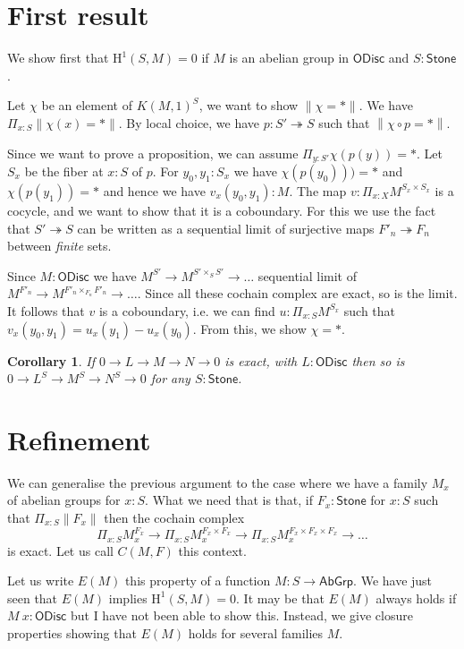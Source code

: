 \documentclass[10pt,a4paper]{article}
\newtheorem{corollary}{Corollary}[section]
\newcommand\HH{\mathrm{H}}
\newcommand{\ODisc}{\mathsf{ODisc}}
\newcommand{\Stone}{\mathsf{Stone}}
\newcommand{\Ab}{\mathsf{AbGrp}}
\newcommand{\ras}{\twoheadrightarrow}
\newcommand\norm[1]{\left\lVert #1 \right\rVert}
\begin{document}
\section{First result}

We show first that $\HH^1(S,M) = 0$ if $M$ is an abelian group in $\ODisc$ and $S:\Stone$.

Let $\chi$ be an element of $K(M,1)^S$, we want to show $\norm{\chi = *}$. We have $\Pi_{x:S}\norm{\chi(x) = *}$.
By local choice, we have $p:S'\ras S$ such that $\norm{\chi\circ p = *}$.

Since we want to prove a proposition, we can assume $\Pi_{y:S'}\chi(p(y)) = *$.
Let $S_x$ be the fiber at $x:S$ of $p$. For $y_0,y_1:S_x$ we have $\chi(p(y_0))) = *$ and $\chi(p(y_1)) = *$
and hence we have $v_x(y_0,y_1):M$. The map $v:\Pi_{x:X}M^{S_x\times S_x}$ is a cocycle, and we want to show
that it is a coboundary. For this we use the fact that $S'\ras S$ can be written as a sequential
limit of surjective maps $F'_n\ras F_n$ between {\em finite} sets.

 Since $M:\ODisc$ we have $M^{S'}\rightarrow M^{S'\times_S S'}\rightarrow\dots$ sequential limit of
 $M^{F'_n}\rightarrow M^{F'_n\times_{F_n} F'_n}\rightarrow\dots$. Since all these cochain complex are exact, so is
 the limit. It follows that $v$ is a coboundary, i.e. we can find $u:\Pi_{x:S}M^{S_x}$ such that
 $v_x(y_0,y_1) = u_x(y_1)-u_x(y_0)$.
 From this, we show $\chi = *$.

 \begin{corollary}\label{Stone1}
   If $0\rightarrow L\rightarrow M\rightarrow N\rightarrow 0$ is exact, with $L:\ODisc$ then
   so is $0\rightarrow L^S\rightarrow M^S\rightarrow N^S\rightarrow 0$ for any $S:\Stone$.
 \end{corollary}
 


\section{Refinement}

We can generalise the previous argument to the case where we have a family $M_x$ of abelian groups
for $x:S$. What we need that is that, if $F_x:\Stone$ for $x:S$ such that $\Pi_{x:S}\norm{F_x}$
then the cochain complex
\[
\Pi_{x:S}M_x^{F_x}\rightarrow \Pi_{x:S}M_x^{F_x\times F_x}\rightarrow \Pi_{x:S}M_x^{F_x\times F_x\times F_x}\rightarrow \dots
\]
is exact. Let us call $C(M,F)$ this context.

Let us write $E(M)$ this property of a function $M:S\rightarrow\Ab$. We have just seen that $E(M)$ implies
$\HH^1(S,M) = 0$.
It may be that $E(M)$ always holds if $M~x:\ODisc$ but I have not been able to show this. Instead, we give
closure properties showing that $E(M)$ holds for several families $M$.
\end{document}
